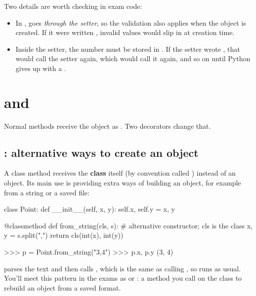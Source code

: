 \documentclass[10pt,a4paper]{article}
\begin{document}
Two details are worth checking in exam code:
\begin{itemize}
\item In ,  goes \emph{through the setter}, so the validation also applies when the object is created. If it were written , invalid values would slip in at creation time.
\item Inside the setter, the number must be stored in . If the setter wrote , that would call the setter again, which would call it again, and so on until Python gives up with a .
\end{itemize}
\setcounter{section}{3}
\section{ and }
Normal methods receive the object as . Two decorators change that.
\subsection{: alternative ways to create an object}
A class method receives the \textbf{class} itself (by convention called ) instead of an object. Its main use is providing extra ways of building an object, for example from a string or a saved file:
\begin{pycode}
class Point:
    def __init__(self, x, y):
        self.x, self.y = x, y

    @classmethod
    def from_string(cls, s):     # alternative constructor; cls is the class
        x, y = s.split(",")
        return cls(int(x), int(y))
\end{pycode}
\begin{txtcode}
>>> p = Point.from_string("3,4")
>>> p.x, p.y
(3, 4)
\end{txtcode}
 parses the text and then calls , which is the same as calling , so  runs as usual. You’ll meet this pattern in the exams as  or : a method you call on the class to rebuild an object from a saved format.
\end{document}
